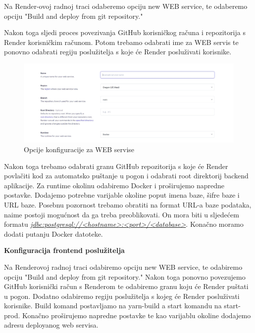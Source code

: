 			 Na Render-ovoj radnoj traci odaberemo opciju new WEB service, te odaberemo opciju "Build and deploy from git repository."
			 
			 
			 
			 Nakon toga sljedi proces povezivanja GitHub korisničkog računa i repozitorija s Render korisničkim računom. Potom trebamo odabrati ime za WEB servis te ponovno odabrati regiju poslužitelja s koje će Render posluživati korisnike.
			 
			  \begin{figure}[H]
			 	\includegraphics[scale=0.4]{slike/kofiguracija_regije.jpeg} %
			 	\centering
			 	\caption{Opcije konfiguracije za WEB servise}
			 	\label{fig:promjene}
			 \end{figure}
			 
			 Nakon toga trebamo odabrati granu GitHub repozitorija s koje će Render povlačiti kod za automatsko puštanje u pogon i odabrati root direktorij backend aplikacije. Za runtime okolinu odabiremo Docker i proširujemo napredne postavke. Dodajemo potrebne varijable okoline poput imena baze, šifre baze i URL baze. Posebnu pozornost trebamo obratiti na format URL-a baze podataka, naime postoji mogućnost da ga treba preoblikovati. On mora biti u sljedećem formatu \textit{\url{jdbc:postgresql://<hostname>:<port>/<database>}}. Konačno moramo dodati putanju Docker datoteke.
			 
			\textbf{Konfiguracija frontend poslužitelja}
			
			
			 Na Renderovoj radnoj traci odabiremo opciju new WEB service, te odabiremo opciju "Build and deploy from git repository." Nakon toga ponovno povezujemo GitHub korisnički račun s Renderom te odabiremo granu koju će Render puštati u pogon. Dodatno odabiremo regiju poslužitelja s kojeg će Render posluživati korisnike. Build komand postavljamo na yarn-build a start komandu na start-prod. Konačno proširujemo napredne postavke te kao varijablu okoline dodajemo adresu deployanog web servisa.
			 
			
			\eject 